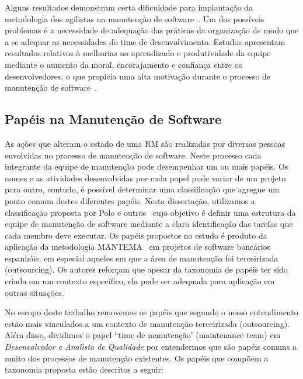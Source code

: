Alguns resultados demonstram certa dificuldade para implantação da metodologia
dos agilistas na manutenção de software~\cite{1402140}. Um dos possíveis
problemas é a necessidade de adequação das práticas da organização de modo que a
se adequar as necessidades do time de desenvolvimento.  Estudos apresentam
resultados relativos à melhorias no aprendizado e produtividade da equipe
mediante o aumento da moral, encorajamento e confiança entre os desenvolvedores,
o que propicia uma alta motivação durante o processo de manutenção de
software~\cite{Choudhari:2014:EIM:2557833.2557845}.


\subsection{Papéis na Manutenção de Software}
\label{subsec:man_visao_geral_papeis_na_manutencao_de_software}

As ações que alteram o estado de uma RM são realizadas por diversas pessoas
envolvidas no processo de manutenção de software. Neste processo cada integrante
da equipe de manutenção pode desempenhar um ou mais papéis. Os nomes e as
atividades desenvolvidas por cada papel pode variar de um projeto para outro,
contudo, é possível determinar uma classificação que agregue um ponto comum
destes diferentes papéis. Nesta dissertação, utilizamos a classificação proposta
por Polo e outros~\cite{Polo1999} cujo objetivo é definir uma estrutura da
equipe de manutenção de software mediante a clara identificação das tarefas que
cada membro deve executar. Os papéis propostos no estudo é produto da aplicação
da metodologia MANTEMA~\cite{756695} em projetos de software bancários
espanhóis, em especial aqueles em que a área de manutenção foi terceirizada
(outsourcing). Os autores reforçam que apesar da taxonomia de papéis ter sido
criada em um contexto específico, ela pode ser adequada para aplicação em outras
situações.

No escopo deste trabalho removemos os papéis que segundo o nosso entendimento
estão mais vinculados a um contexto de manutenção terceirizada (outsourcing).
Além disso, dividimos o papel ``time de manutenção' (maintenance team) em
\textit{Desenvolvedor e Analista de Qualidade} por entendermos que são papéis
comuns a muito dos processos de manutenção existentes. Os papéis que compõem a
taxonomia proposta estão descritos a seguir:

